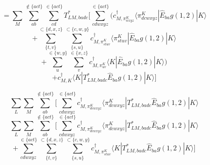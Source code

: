 \documentclass[12pt]{article}
\begin{document}
\begin{equation*}
= \sum_{M}  \sum_{ab}^{\notin \{act\} }\sum_{cd}^{\in\{act\}} T^{*}_{LM,badc} \Bigg[\sum_{cdwxyz}^{\in\{act\}}\Bigg( 
 c^{\dagger}_{M,\pi^{K}_{wxyz}}  \langle \pi^{K}_{dcwxyz}|\hat{E}_{ba}g(1,2) |K  \rangle
\end{equation*}
\begin{equation*}
+ \sum_{\{t,v\}}^{\subset\{d,x,z\}}\sum_{\{s,u\}}^{\subset\{c,w,y\}}
 c^{\dagger}_{M,\pi^{K}_{stuv}}  \langle \pi^{K}_{stuv}|\hat{E}_{ba}g(1,2) |K  \rangle 
\end{equation*}
\begin{equation*}
+ \sum_{u}^{\in\{w,y\}} \sum_{v}^{\in\{x,z\}} 
 c^{\dagger}_{M,\pi^{K}_{uv}}  \langle K|\hat{E}_{ba}g(1,2) |K  \rangle\Bigg)
\end{equation*}
\begin{equation*}
+ c^{\dagger}_{M,K}  \langle K|T^{*}_{LM,badc}\hat{E}_{ba}g(1,2) |K  \rangle\Bigg]
\end{equation*}






\begin{equation*}
\sum_{L} \sum_{M}  \sum_{ab}^{\notin \{act\} } \Bigg[\sum_{cdwxyz}^{\in\{act\}} 
 c^{\dagger}_{M,\pi^{K}_{dcwxyz}}  \langle \pi^{K}_{dcwxyz}|T^{*}_{LM,badc}\hat{E}_{ba}g(1,2) |K  \rangle
\end{equation*}
\begin{equation*}
\sum_{L} \sum_{M}  \sum_{ab}^{\notin \{act\} } \Bigg[\sum_{cdwxyz}^{\in\{act\}} 
 c^{\dagger}_{M,\pi^{K}_{dcwxyz}}  \langle \pi^{K}_{dcwxyz}|T^{*}_{LM,badc}\hat{E}_{ba}g(1,2) |K  \rangle
\end{equation*}
\begin{equation*}
+ \sum_{cdwxyz}^{\in\{act\}} \sum_{\{t,v\}}^{\subset\{d,x,z\}}\sum_{\{s,u\}}^{\subset\{c,w,y\}}
 c^{\dagger}_{M,\pi^{K}_{stuv}}  \langle K |T^{*}_{LM,badc}\hat{E}_{ba}g(1,2) |K  \rangle \Bigg]
\end{equation*}
\end{document}
